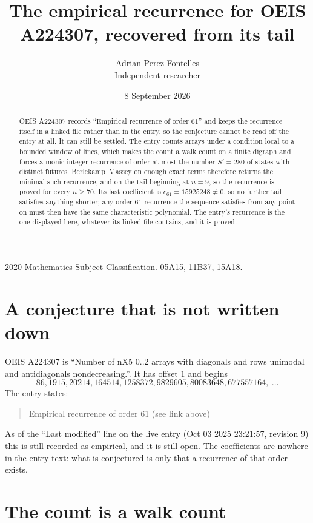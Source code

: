 \documentclass[11pt,a4paper]{article}
\title{The empirical recurrence for OEIS A224307, recovered from its tail}
\author{Adrian Perez Fontelles\\ \small Independent researcher}
\date{8 September 2026}
\theoremstyle{plain}
\theoremstyle{definition}
\begin{document}
\maketitle

\begin{abstract}
OEIS A224307 records ``Empirical recurrence of order $61$'' and keeps the recurrence itself in
a linked file rather than in the entry, so the conjecture cannot be read off the entry at all.
It can still be settled. The entry counts arrays under a condition local to a bounded window of
lines, which makes the count a walk count on a finite digraph and forces a monic integer
recurrence of order at most the number $S'=280$ of states with distinct futures. Berlekamp--Massey on
enough exact terms therefore returns the minimal such recurrence, and on the tail beginning at $n=9$, so the recurrence is proved for every $n\ge70$.
Its last coefficient is $c_{61}=15925248\neq0$, so no further tail satisfies anything
shorter; any order-$61$ recurrence the sequence satisfies from any point on must then have
the same characteristic polynomial. The entry's recurrence is the one displayed here, whatever
its linked file contains, and it is proved.
\end{abstract}

\noindent\small 2020 Mathematics Subject Classification. 05A15, 11B37, 15A18.\normalsize

\section{A conjecture that is not written down}

OEIS A224307 is ``Number of nX5 0..2 arrays with diagonals and rows unimodal and antidiagonals nondecreasing.''. It has offset $1$ and begins
\[
86, 1915, 20214, 164514, 1258372, 9829605, 80083648, 677557164,\ \dots
\]
The entry states:
\begin{quote}
Empirical recurrence of order 61 (see link above)
\end{quote}
As of the ``Last modified'' line on the live entry (Oct 03 2025 23:21:57, revision 9)
this is still recorded as empirical, and it is still open. The coefficients are nowhere in the
entry text: what is conjectured is only that a recurrence of that order exists.

\section{The count is a walk count}
\end{document}
